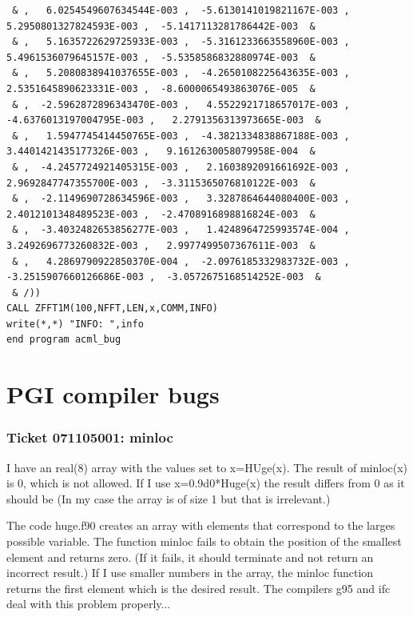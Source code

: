 \documentclass[a4paper,10pt]{report}
\begin{document}
{\begin{verbatim}
 & ,   6.0254549607634544E-003 ,  -5.6130141019821167E-003 ,   5.2950801327824593E-003 ,  -5.1417113281786442E-003  &
 & ,   5.1635722629725933E-003 ,  -5.3161233663558960E-003 ,   5.4961536079645157E-003 ,  -5.5358586832880974E-003  &
 & ,   5.2080838941037655E-003 ,  -4.2650108225643635E-003 ,   2.5351645890623331E-003 ,  -8.6000065493863076E-005  &
 & ,  -2.5962872896343470E-003 ,   4.5522921718657017E-003 ,  -4.6376013197004795E-003 ,   2.2791356313973665E-003  &
 & ,   1.5947745414450765E-003 ,  -4.3821334838867188E-003 ,   3.4401421435177326E-003 ,   9.1612630058079958E-004  &
 & ,  -4.2457724921405315E-003 ,   2.1603892091661692E-003 ,   2.9692847747355700E-003 ,  -3.3115365076810122E-003  &
 & ,  -2.1149690728634596E-003 ,   3.3287864644080400E-003 ,   2.4012101348489523E-003 ,  -2.4708916898816824E-003  &
 & ,  -3.4032482653856277E-003 ,   1.4248964725993574E-004 ,   3.2492696773260832E-003 ,   2.9977499507367611E-003  &
 & ,   4.2869790922850370E-004 ,  -2.0976185332983732E-003 ,  -3.2515907660126686E-003 ,  -3.0572675168514252E-003  &
 & /))
CALL ZFFT1M(100,NFFT,LEN,x,COMM,INFO)
write(*,*) "INFO: ",info
end program acml_bug

\end{verbatim}
} %

\section{PGI compiler bugs}

\subsubsection{Ticket 071105001: minloc}

I have an real(8) array with the values set to x=HUge(x). The
result of minloc(x) is 0, which is not allowed. If I use x=0.9d0*Huge(x)
the result differs from 0 as it should be (In my case the array is of
size 1 but that is irrelevant.)

The code huge.f90 creates an array with elements that correspond to the
larges possible variable. The function minloc fails to obtain the
position of the smallest element and returns zero. (If it fails, it
should  terminate and not return an incorrect result.)  If I use smaller
numbers in the array, the minloc function returns the first element
which is the desired result. The compilers g95 and ifc deal with this
problem properly...
\end{document}
